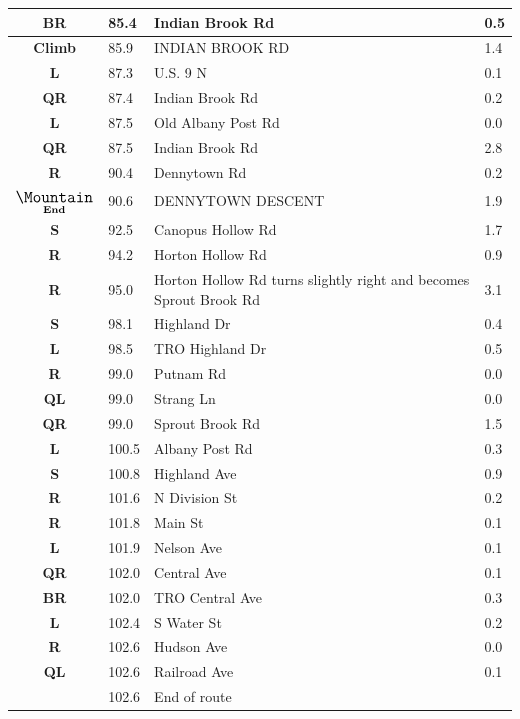 \documentclass[11pt]{article}
\begin{document}
\begin{center}
\begin{supertabular}{|c|p{0.30in}|p{2.25in}|l|}
 \textbf{BR} &  85.4 & Indian Brook Rd &   0.5 \\ \hline
 \textbf{Climb} &  85.9 & INDIAN BROOK RD &   1.4 \\ \hline
 \textbf{L} &  87.3 & U.S. 9 N &   0.1 \\ \hline
{} \textbf{QR} &  87.4 & Indian Brook Rd &   0.2 \\ \hline
 \textbf{L} &  87.5 & Old Albany Post Rd &   0.0 \\ \hline
{} \textbf{QR} &  87.5 & Indian Brook Rd &   2.8 \\ \hline
{} \textbf{R} &  90.4 & Dennytown Rd &   0.2 \\ \hline
 $\underset{\textbf{End}}{\text{\large \Mountain}}$ &  90.6 & DENNYTOWN DESCENT &   1.9 \\ \hline
 \textbf{S} &  92.5 & Canopus Hollow Rd &   1.7 \\ \hline
{} \textbf{R} &  94.2 & Horton Hollow Rd &   0.9 \\ \hline
{} \textbf{R} &  95.0 & Horton Hollow Rd turns slightly right and becomes Sprout Brook Rd &   3.1 \\ \hline
 \textbf{S} &  98.1 & Highland Dr &   0.4 \\ \hline
 \textbf{L} &  98.5 & TRO Highland Dr &   0.5 \\ \hline
{} \textbf{R} &  99.0 & Putnam Rd &   0.0 \\ \hline
 \textbf{QL} &  99.0 & Strang Ln &   0.0 \\ \hline
{} \textbf{QR} &  99.0 & Sprout Brook Rd &   1.5 \\ \hline
 \textbf{L} & 100.5 & Albany Post Rd &   0.3 \\ \hline
 \textbf{S} & 100.8 & Highland Ave &   0.9 \\ \hline
{} \textbf{R} & 101.6 & N Division St &   0.2 \\ \hline
{} \textbf{R} & 101.8 & Main St &   0.1 \\ \hline
 \textbf{L} & 101.9 & Nelson Ave &   0.1 \\ \hline
{} \textbf{QR} & 102.0 & Central Ave &   0.1 \\ \hline
{} \textbf{BR} & 102.0 & TRO Central Ave &   0.3 \\ \hline
 \textbf{L} & 102.4 & S Water St &   0.2 \\ \hline
{} \textbf{R} & 102.6 & Hudson Ave &   0.0 \\ \hline
 \textbf{QL} & 102.6 & Railroad Ave &   0.1 \\ \hline
{} \textbf{} & 102.6 & End of route &  \\ \hline

\end{supertabular}
\end{center}
\end{document}
